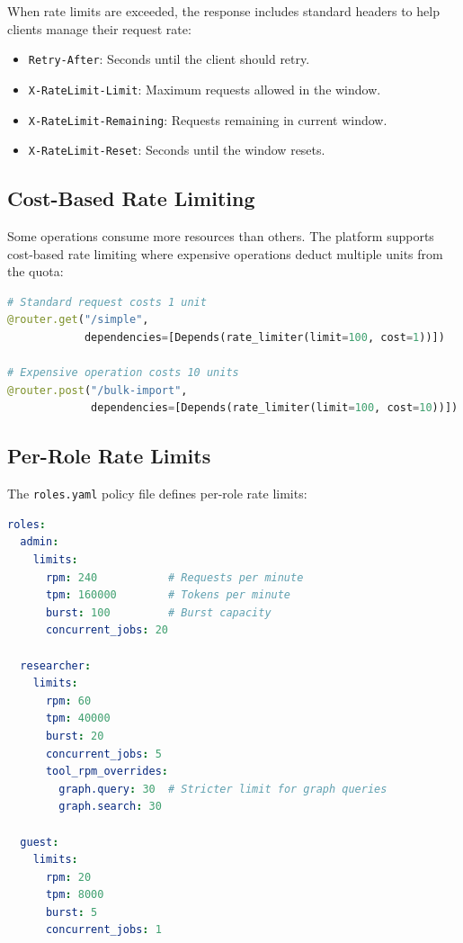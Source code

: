 When rate limits are exceeded, the response includes standard headers to help clients manage their request rate:

\begin{itemize}
    \item \texttt{Retry-After}: Seconds until the client should retry.
    \item \texttt{X-RateLimit-Limit}: Maximum requests allowed in the window.
    \item \texttt{X-RateLimit-Remaining}: Requests remaining in current window.
    \item \texttt{X-RateLimit-Reset}: Seconds until the window resets.
\end{itemize}

\subsection{Cost-Based Rate Limiting}
\label{subsec:rate-limit-cost}

Some operations consume more resources than others. The platform supports cost-based rate limiting where expensive operations deduct multiple units from the quota:

\begin{lstlisting}[language=Python,caption={Cost-based rate limiting example}]
# Standard request costs 1 unit
@router.get("/simple", 
            dependencies=[Depends(rate_limiter(limit=100, cost=1))])

# Expensive operation costs 10 units
@router.post("/bulk-import", 
             dependencies=[Depends(rate_limiter(limit=100, cost=10))])
\end{lstlisting}

\subsection{Per-Role Rate Limits}
\label{subsec:rate-limit-roles}

The \texttt{roles.yaml} policy file defines per-role rate limits:

\begin{lstlisting}[language=yaml,caption={Role-based rate limit configuration}]
roles:
  admin:
    limits:
      rpm: 240           # Requests per minute
      tpm: 160000        # Tokens per minute
      burst: 100         # Burst capacity
      concurrent_jobs: 20
  
  researcher:
    limits:
      rpm: 60
      tpm: 40000
      burst: 20
      concurrent_jobs: 5
      tool_rpm_overrides:
        graph.query: 30  # Stricter limit for graph queries
        graph.search: 30
  
  guest:
    limits:
      rpm: 20
      tpm: 8000
      burst: 5
      concurrent_jobs: 1
\end{lstlisting}

